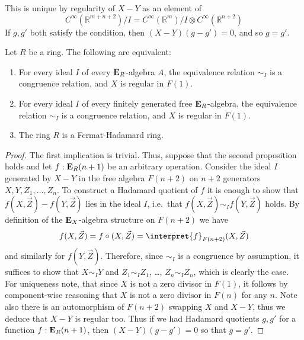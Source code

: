 {\begin{example}
This is unique by regularity of \(X-Y\) as an element of \[C^\infty(\mathbb{R}^{m+n+2})/I = C^\infty(\mathbb{R}^m)/I \otimes C^\infty(\mathbb{R}^{n+2})\]
If $g, g'$ both satisfy the condition, then $(X-Y)(g-g') = 0$, and so $g = g'$.
\end{example}

\begin{proposition}
  \label{prop:fermat-ring-quotients}
  Let \(R\) be a ring.
  The following are equivalent:

  \begin{enumerate}
    \item
      For every ideal \(I\) of every \(\mathbf{E}_R\)-algebra \(A\), the equivalence relation \(\sim_I\) is a congruence relation, and $X$ is regular in $F(1)$.
      \item
      For every ideal \(I\) of every finitely generated free \(\mathbf{E}_R\)-algebra, the equivalence relation \(\sim_I\) is a congruence relation, and $X$ is regular in $F(1)$.
    \item
      The ring \(R\) is a Fermat-Hadamard ring.
  \end{enumerate}
\end{proposition}
\begin{proof}
  The first implication is trivial.
  Thus, suppose that the second proposition holds and let \(f:\mathbf{E}_R(n+1)\) be an arbitrary operation.
  Consider the ideal \(I\) generated by \(X-Y\) in the free algebra \(F(n+2)\) on \(n+2\) generators \(X,Y,Z_1,\dots,Z_n\).
  To construct a Hadamard quotient of \(f\) it is enough to show that \(f(X,\vec Z)-f(Y,\vec Z)\) lies in the ideal \(I\), i.e.~that \(f(X,\vec Z)\sim_I f(Y,\vec Z)\) holds.
  By definition of the \(\mathbf{E}_X\)-algebra structure on \(F(n+2)\) we have
  \[
    f(X,\vec Z) = f \circ (X,\vec Z) = \interpret{f}_{F(n+2)}(X,\vec Z)
  \]
  and similarly for \(f(Y,\vec Z)\).
  Therefore, since \(\sim_I\) is a congruence by assumption, it suffices to show that \(X\sim_I Y\) and \(Z_1 \sim_I Z_1\), \dots, \(Z_n\sim_I Z_n\), which is clearly the case.
  For uniqueness note, that since $X$ is not a zero divisor in $F(1)$, it follows by component-wise reasoning that $X$ is not a zero divisor in $F(n)$ for any $n$.
  Note also there is an automorphism of $F(n+2)$ swapping $X$ and $X-Y$, thus we deduce that $X-Y$ is regular too.
  Thus if we had Hadamard quotients $g, g'$ for a function $f : \mathbf{E}_R(n+1)$, then $(X-Y)(g - g') = 0$ so that $g = g'$.


\end{proof}}
